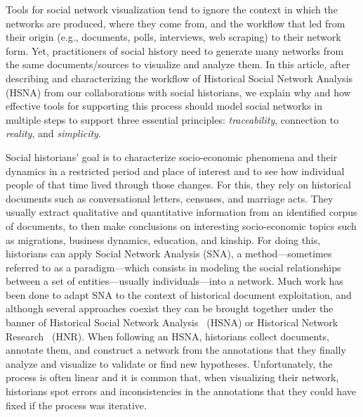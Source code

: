 
Tools for social network visualization tend to ignore the context in which the networks are produced, where they come from, and the workflow that led from their origin (e.g., documents, polls, interviews, web scraping) to their network form.
Yet, practitioners of social history need to generate many networks from the same documents/sources to visualize and analyze them.
In this article, after describing and characterizing the workflow of Historical Social Network Analysis~\cite{wetherellHistoricalSocialNetwork1998} (HSNA) from our collaborations with social historians, we explain why and how effective tools for supporting this process should model social networks in multiple steps to support three essential principles: \emph{traceability}, connection to \emph{reality}, and \emph{simplicity}.

Social historians' goal is to characterize socio-economic phenomena and their dynamics in a restricted period and place of interest and to see how individual people of that time lived through those changes.
For this, they rely on historical documents such as conversational letters, censuses, and marriage acts.
They usually extract qualitative and quantitative information from an identified corpus of documents, to then make conclusions on interesting socio-economic topics such as migrations, business dynamics, education, and kinship.
For doing this, historians can apply Social Network Analysis (SNA), a method---sometimes referred to as a paradigm---which consists in modeling the social relationships between a set of entities---usually individuals---into a network.
Much work has been done to adapt SNA to the context of historical document exploitation, and although several approaches coexist they can be brought together under the banner of Historical Social Network Analysis~\cite{wetherellHistoricalSocialNetwork1998} (HSNA) or Historical Network Research~\cite{kerschbaumerPowerNetworksProspects2015} (HNR).
When following an HSNA, historians collect documents, annotate them, and construct a network from the annotations that they finally analyze and visualize to validate or find new hypotheses.
Unfortunately, the process is often linear and it is common that, when visualizing their network, historians spot errors and inconsistencies in the annotations that they could have fixed if the process was iterative.

